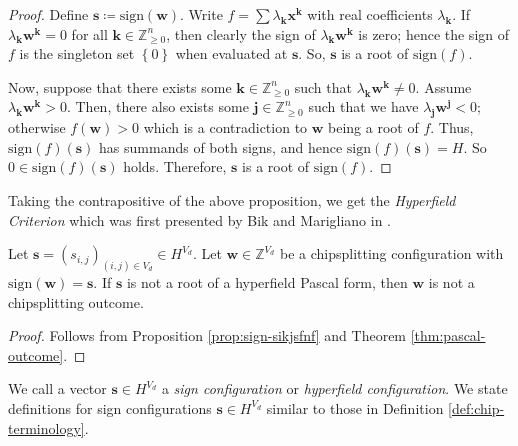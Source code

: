 \begin{proof}
    Define \( \mathbf{s} \coloneqq \mathrm{sign}(\mathbf{w}) \). Write \( f = \sum \lambda_{\mathbf{k}} \mathbf{x}^{\mathbf{k}} \) with real coefficients \( \lambda_{\mathbf{k}} \). If \( \lambda_{\mathbf{k}} \mathbf{w}^{\mathbf{k}} = 0 \) for all \( \mathbf{k} \in \mathbb{Z}^n_{\geq 0} \), then clearly the sign of \( \lambda_{\mathbf{k}} \mathbf{w}^{\mathbf{k}} \) is zero; hence the sign of \( f \) is the singleton set \( \left\{ 0 \right\} \) when evaluated at \( \mathbf{s} \). So, \( \mathbf{s} \) is a root of \( \mathrm{sign}(f) \).

    Now, suppose that there exists some \( \mathbf{k} \in \mathbb{Z}^n_{\geq 0} \) such that \( \lambda_{\mathbf{k}} \mathbf{w}^{\mathbf{k}} \neq 0 \). Assume \(  \lambda_{\mathbf{k}} \mathbf{w}^{\mathbf{k}} > 0 \). Then, there also exists some \( \mathbf{j} \in \mathbb{Z}^n_{\geq 0} \) such that we have \( \lambda_{\mathbf{j}} \mathbf{w}^{\mathbf{j}} < 0 \); otherwise \( f(\mathbf{w}) > 0 \) which is a contradiction to \( \mathbf{w} \) being a root of \( f \). Thus, \( \mathrm{sign}(f)(\mathbf{s}) \) has summands of both signs, and hence \( \mathrm{sign}(f)(\mathbf{s}) = H \). So \( 0 \in  \mathrm{sign}(f)(\mathbf{s}) \) holds. Therefore, \( \mathbf{s} \) is a root of \( \mathrm{sign}(f) \).
\end{proof}

Taking the contrapositive of the above proposition, we get the \emph{Hyperfield Criterion} which was first presented by Bik and Marigliano in \cite{bik2022classifying}.

\begin{proposition}\label{prop:hyperfield-criterion}
    Let \( \mathbf{s} = (s_{i,j})_{(i,j) \in V_d} \in H^{V_d} \). Let \( \mathbf{w} \in \mathbb{Z}^{V_d} \) be a chipsplitting configuration with \( \mathrm{sign}(\mathbf{w}) = \mathbf{s} \). If \( \mathbf{s} \) is not a root of a hyperfield Pascal form, then \( \mathbf{w} \) is not a chipsplitting outcome.
\end{proposition}

\begin{proof}
    Follows from Proposition \ref{prop:sign-sikjsfnf} and Theorem \ref{thm:pascal-outcome}.
\end{proof}

We call a vector \( \mathbf{s} \in H^{V_d} \) a \emph{sign configuration} or \emph{hyperfield configuration}. We state definitions for sign configurations \( \mathbf{s} \in H^{V_d} \) similar to those in Definition \ref{def:chip-terminology}.

